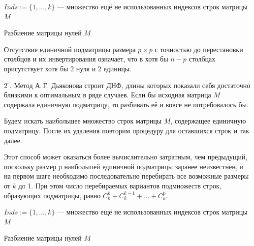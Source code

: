 \documentclass[12pt,a4paper,oneside,fleqn,leqno]{article}
\theoremstyle{definition}
\begin{document}
		\begin{algorithm}[H]
			\SetAlgoLined
			$Inds \mathbin{:=} \{1,\ldots,k\}$ --- множество ещё не использованных индексов строк матрицы $M$\;
			\caption{Разбиение матрицы нулей $M$}
		\label{slice}
		\end{algorithm}\par
			Отсутствие единичной подматрицы размера $p \times p$ с точностью до перестановки столбцов и их инвертирования означает, что в хотя бы $n - p$ столбцах присутствует хотя бы 2 нуля и 2 единицы.\par
			$2^{\circ}.$ Метод А.\,Г. Дьяконова строит ДНФ, длины которых показали себя достаточно близкими к оптимальным в ряде случаев. Если бы исходная матрица $M$ содержала единичную подматрицу, то разбивать её и вовсе не потребовалось бы.\par
			Будем искать наибольшее множество строк матрицы $M$, содержащее единичную подматрицу. После их удаления повторим процедуру для оставшихся строк и так далее.\par
			Этот способ может оказаться более вычислительно затратным, чем предыдущий, поскольку размер $p$ наибольшей единичной подматрицы заранее неизвестнен, и на первом шаге необходимо последовательно перебирать все возможные размеры от $k$ до 1. При этом число перебираемых вариантов подмножеств строк, образующих подматрицы, равно $C_k^k + C_k^{k - 1} + \ldots + C_k^p$.\par
			\begin{algorithm}[H]
			\SetAlgoLined
			$Inds \mathbin{:=} \{1,\ldots,k\}$ --- множество ещё не использованных индексов строк матрицы $M$\;
			\caption{Разбиение матрицы нулей $M$}
		\label{slice_max_id}
		\end{algorithm}\par
\end{document}
